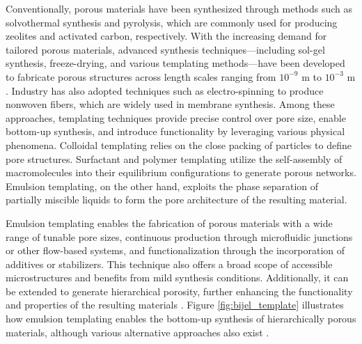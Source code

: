 Conventionally, porous materials have been synthesized through methods such as solvothermal synthesis and pyrolysis, which are commonly 
used for producing zeolites and activated carbon, respectively. With the increasing demand for tailored porous materials, advanced synthesis 
techniques—including sol-gel synthesis, freeze-drying, and various templating methods—have been developed to fabricate porous structures across 
length scales ranging from $10^{-9}$ m to $10^{-3}$ m 
\cite{stein_morphological_2008, ray_comprehensive_2016, cervellere_mesoscopic_2019, garcia-bennett_unique_2020, zhang_emulsion_2019, alves-rosa_design_2013}. 
Industry has also adopted techniques such as electro-spinning to produce nonwoven fibers, which are widely used in membrane synthesis.  
Among these approaches, templating techniques provide precise control over pore size, enable bottom-up synthesis, and introduce functionality by 
leveraging various physical phenomena. Colloidal templating relies on the close packing of particles to define pore structures. Surfactant and 
polymer templating utilize the self-assembly of macromolecules into their equilibrium configurations to generate porous networks. Emulsion templating, 
on the other hand, exploits the phase separation of partially miscible liquids to form the pore architecture of the resulting material.  

Emulsion templating enables the fabrication of porous materials with a wide range of tunable pore sizes, continuous production through microfluidic 
junctions or other flow-based systems, and functionalization through the incorporation of additives or stabilizers. This technique also offers a broad 
scope of accessible microstructures and benefits from mild synthesis conditions. Additionally, it can be extended to generate hierarchical porosity, 
further enhancing the functionality and properties of the resulting materials \cite{yang_hierarchically_2017, thompson_hierarchically_2019, wang_morphology_2023}.  
Figure \ref{fig:bijel_template} illustrates how emulsion templating enables the bottom-up synthesis of hierarchically porous materials, although various 
alternative approaches also exist 
\cite{garcia_scalable_2019, santiago_cordoba_aerobijels_2020, thorson_bijel-templated_2019, lu_controllable_2020, wang_morphology_2023}.

